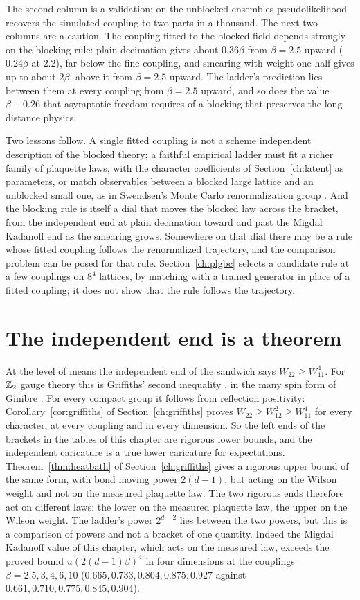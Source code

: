 The second column is a validation: on the unblocked ensembles pseudolikelihood recovers the simulated coupling to two parts in a thousand. The next two columns are a caution. The coupling fitted to the blocked field depends strongly on the blocking rule: plain decimation gives about $0.36\beta$ from $\beta=2.5$ upward ($0.24\beta$ at $2.2$), far below the fine coupling, and smearing with weight one half gives up to about $2\beta$, above it from $\beta=2.5$ upward. The ladder's prediction lies between them at every coupling from $\beta=2.5$ upward, and so does the value $\beta-0.26$ that asymptotic freedom requires of a blocking that preserves the long distance physics.

Two lessons follow. A single fitted coupling is not a scheme independent description of the blocked theory; a faithful empirical ladder must fit a richer family of plaquette laws, with the character coefficients of Section~\ref{ch:latent} as parameters, or match observables between a blocked large lattice and an unblocked small one, as in Swendsen's Monte Carlo renormalization group \cite{Sw79}. And the blocking rule is itself a dial that moves the blocked law across the bracket, from the independent end at plain decimation toward and past the Migdal Kadanoff end as the smearing grows. Somewhere on that dial there may be a rule whose fitted coupling follows the renormalized trajectory, and the comparison problem can be posed for that rule. Section~\ref{ch:plgbc} selects a candidate rule at a few couplings on $8^4$ lattices, by matching with a trained generator in place of a fitted coupling; it does not show that the rule follows the trajectory.

\section{The independent end is a theorem}

At the level of means the independent end of the sandwich says $W_{22}\ge W_{11}^4$. For $\mathbb{Z}_2$ gauge theory this is Griffiths' second inequality \cite{Gri67}, in the many spin form of Ginibre \cite{Gi70}. For every compact group it follows from reflection positivity: Corollary~\ref{cor:griffiths} of Section~\ref{ch:griffiths} proves $W_{22}\ge W_{12}^2\ge W_{11}^4$ for every character, at every coupling and in every dimension. So the left ends of the brackets in the tables of this chapter are rigorous lower bounds, and the independent caricature is a true lower caricature for expectations. Theorem~\ref{thm:heatbath} of Section~\ref{ch:griffiths} gives a rigorous upper bound of the same form, with bond moving power $2(d-1)$, but acting on the Wilson weight and not on the measured plaquette law. The two rigorous ends therefore act on different laws: the lower on the measured plaquette law, the upper on the Wilson weight. The ladder's power $2^{d-2}$ lies between the two powers, but this is a comparison of powers and not a bracket of one quantity. Indeed the Migdal Kadanoff value of this chapter, which acts on the measured law, exceeds the proved bound $u(2(d-1)\beta)^4$ in four dimensions at the couplings $\beta=2.5,3,4,6,10$ ($0.665,0.733,0.804,0.875,0.927$ against $0.661,0.710,0.775,0.845,0.904$).

